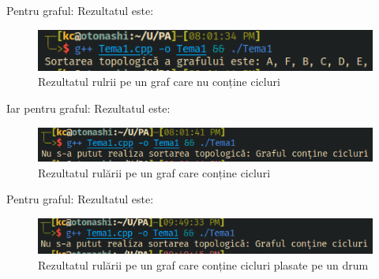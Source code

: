 \documentclass{article}
\begin{document}
    Pentru graful:
    Rezultatul este:
    \begin{figure}[H]
        \includegraphics[width=0.75\linewidth]{Tema1Rulare1}
        \centering
        \caption{Rezultatul rulrii pe un graf care nu conține cicluri}
    \end{figure}


    Iar pentru graful:
    Rezultatul este:
    \begin{figure}[H]
        \includegraphics[width=0.75\linewidth]{Tema1Rulare2}
        \centering
        \caption{Rezultatul rulării pe un graf care conține cicluri}
    \end{figure}

    Pentru graful:
    Rezultatul este:
    \begin{figure}[H]
        \includegraphics[width=0.75\linewidth]{Tema1Rulare3}
        \centering
        \caption{Rezultatul rulării pe un graf care conține cicluri plasate pe un drum}
    \end{figure}
\end{document}
